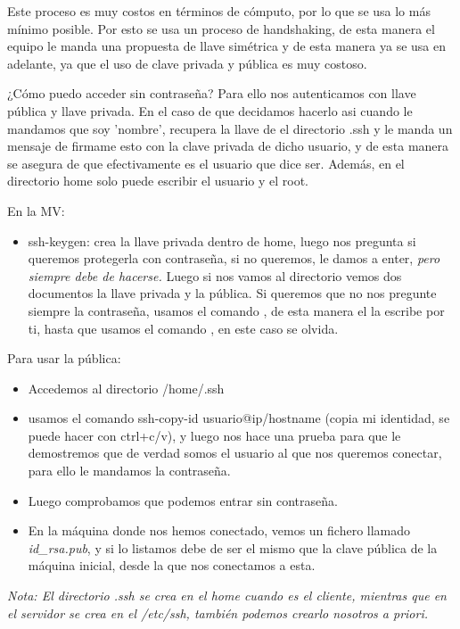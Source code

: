 Este proceso es muy costos en términos de cómputo, por lo que se usa lo más mínimo posible. Por esto se usa un proceso de handshaking, de esta manera el equipo le manda una propuesta de llave simétrica y de esta manera ya se usa en adelante, ya que el uso de clave privada y pública es muy costoso.

¿Cómo puedo acceder sin contraseña? Para ello nos autenticamos con llave pública y llave privada. En el caso de que decidamos hacerlo asi cuando le mandamos que soy 'nombre', recupera la llave de el directorio .ssh y le manda un mensaje de firmame esto con la clave privada de dicho usuario, y de esta manera se asegura de que efectivamente es el usuario que dice ser. Además, en el directorio home solo puede escribir el usuario y el root.

En la MV:

\begin{itemize}
    \item ssh-keygen: crea la llave privada dentro de home, luego nos pregunta si queremos protegerla con contraseña, si no queremos, le damos a enter, \textit{pero siempre debe de hacerse.} Luego si nos vamos al directorio vemos dos documentos la llave privada y la pública. Si queremos que no nos pregunte siempre la contraseña, usamos el comando , de esta manera el la escribe por ti, hasta que usamos el comando , en este caso se olvida.
\end{itemize}

Para usar la pública:
\begin{itemize}
    \item Accedemos al directorio /home/.ssh 
    \item usamos el comando ssh-copy-id usuario@{ip/hostname} (copia mi identidad, se puede hacer con ctrl+c/v), y luego nos hace una prueba para que le demostremos que de verdad somos el usuario al que nos queremos conectar, para ello le mandamos la contraseña.
    \item Luego comprobamos que podemos entrar sin contraseña.
    \item En la máquina donde nos hemos conectado, vemos un fichero llamado \textit{id\_rsa.pub}, y si lo listamos debe de ser el mismo que la clave pública de la máquina inicial, desde la que nos conectamos a esta.
\end{itemize}

\textit{Nota: El directorio .ssh se crea en el home cuando es el cliente, mientras que en el servidor se crea en el /etc/ssh, también podemos crearlo nosotros a priori.}

